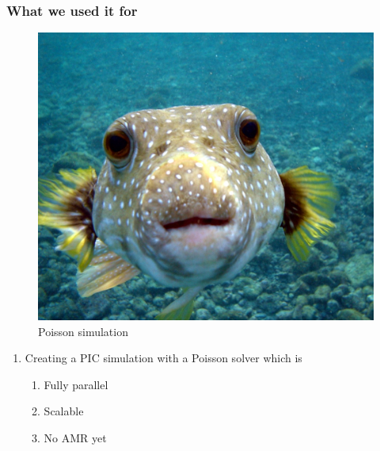 \documentclass{beamer}
\begin{document}
\begin{frame}[fragile]
 \frametitle{What we used it for}
  \begin{figure}
  \centering
  \includegraphics[height=0.2\textheight]{poisson.jpg}
  \caption{\tiny{Poisson simulation}}
 \end{figure}
 \begin{enumerate}
  \item Creating a PIC simulation with a Poisson solver which is
  \begin{enumerate}
   \item Fully parallel
   \item Scalable
   \item No AMR yet
  \end{enumerate}
 \end{enumerate}
\end{frame}
\end{document}
